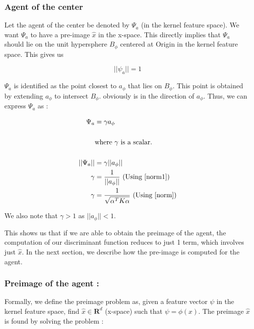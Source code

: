 \documentclass{article} %
\begin{document}
\subsubsection{Agent of the center}

Let the agent of the center be denoted by $\Psi_a$ (in the kernel feature space). We want $\Psi_a$ to have a pre-image $\hat{x}$ in the x-space.  This directly implies that $\Psi_a$ should lie on the unit hypersphere  $B_{\phi}$ centered at Origin in the kernel feature space. This gives us  

\begin{equation}\label{norm1}
||\psi_a|| = 1 
\end{equation}

$\Psi_a$ is identified as the point closest to $a_\phi$ that lies on $B_{\phi}$. This point is obtained by  extending $a_\phi$ to intersect $B_\phi$. obviously is in the direction of $a_\phi$.
Thus, we can express $\Psi_a$ as :

\begin{equation}
\begin{split}
\Psi_a &= \gamma a_\phi \\\\
&\text{where } \gamma  \text{ is a scalar.} \\ \\
||\Psi_a|| &= \gamma ||a_\phi||  \\
\gamma &= \frac{1}{||a_\phi||}  \text{  (Using  \ref{norm1})} \\ 
\gamma &= \frac{1}{\sqrt{\alpha^T K \alpha}} \text{  (Using  \ref{norm})} 
\end{split}
\end{equation}


We also note that $\gamma >1$ as $||a_\phi|| < 1$.

This shows us that if we are able to obtain the preimage of the agent, the computation of our discriminant function reduces to just 1 term, which involves just $\hat{x}$. In the next section, we describe how the pre-image is computed for the agent.



\subsubsection{Preimage of the agent :}

Formally, we define the preimage problem as, given a feature vector $\psi$ in the kernel feature space, find $\hat{x} \in \mathbf{R}^d $ (x-space) such that $\psi = \phi(x)$.
The preimage $\hat{x}$ is found by solving the problem :
\end{document}
